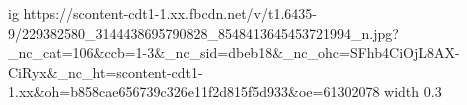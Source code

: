  
 
 
 
 

\ifcmt
  ig https://scontent-cdt1-1.xx.fbcdn.net/v/t1.6435-9/229382580_3144438695790828_8548413645453721994_n.jpg?_nc_cat=106&ccb=1-3&_nc_sid=dbeb18&_nc_ohc=SFhb4CiOjL8AX-CiRyx&_nc_ht=scontent-cdt1-1.xx&oh=b858cae656739c326e11f2d815f5d933&oe=61302078
  width 0.3
\fi

